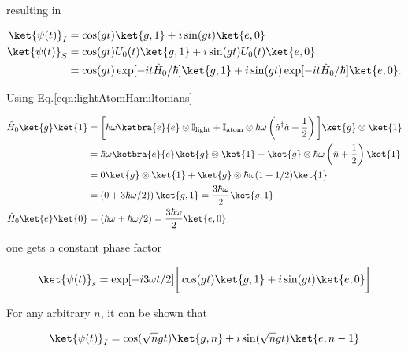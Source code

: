 \noindent resulting in 

\begin{equation}
\begin{aligned}
\ket{\psi(t)}_I & = \cos(gt)\ket{g,1}+i\sin(gt)\ket{e,0}\\
\ket{\psi(t)}_S & = \cos(gt)U_0(t)\ket{g,1}+i\sin(gt)U_0(t)\ket{e,0}\\
& = \cos(gt)\exp[-it \hat{H}_0/\hbar]\ket{g,1}+i\sin(gt)\exp[-it \hat{H}_0/\hbar]\ket{e,0}.
\end{aligned}
\end{equation}

\noindent Using Eq.\eqref{eqn:lightAtomHamiltonians}

\begin{equation}
\begin{aligned}
\hat{H}_0\ket{g}\ket{1} & = \bigg[\hbar\omega\ketbra{e}{e}\otimes\mathbb{I}_\text{light} + \mathbb{I}_\text{atom}\otimes \hbar\omega\left(\hat{a}^\dagger\hat{a}+\frac{1}{2}\right)\bigg]\ket{g}\otimes\ket{1}  \\
& = \hbar\omega\ketbra{e}{e}\ket{g} \otimes \ket{1} + \ket{g}\otimes \hbar\omega\left(\hat{n}+\frac{1}{2}\right)\ket{1}\\
& = 0  \ket{g} \otimes\ket{1} + \ket{g} \otimes \hbar\omega(1+1/2)\ket{1}\\
& = \left(0+3\hbar\omega/2)\right)\ket{g,1} = \frac{3\hbar\omega}{2}\ket{g,1}\\
\hat{H}_0\ket{e}\ket{0} & = (\hbar\omega + \hbar\omega/2) = \frac{3\hbar\omega}{2}\ket{e,0}
\end{aligned}
\end{equation}

\noindent one gets a constant phase factor

\textcolor{red}{\begin{equation}
	\ket{\psi(t)}_s = \exp[-i3\omega t/2]\bigg[\cos(gt)\ket{g,1}+i\sin(gt)\ket{e,0}\bigg]
	\end{equation}}

\noindent For any arbitrary $n$, it can be shown that

\textcolor{red}{\begin{equation}
	\ket{\psi(t)}_I = \cos(\sqrt{n}gt)\ket{g,n}+i\sin(\sqrt{n}gt)\ket{e,n-1}
	\end{equation}}  

\newpage
